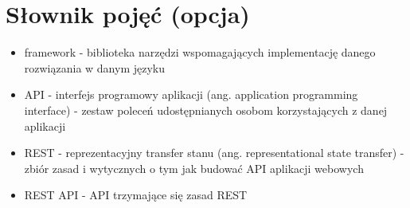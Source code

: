 \documentclass[../main.tex]{subfiles}
\begin{document}
\section{Słownik pojęć (opcja)}
    \begin{itemize}
        \item framework - biblioteka narzędzi wspomagających implementację danego rozwiązania w danym języku
        \item API - interfejs programowy aplikacji (ang. application programming interface) - zestaw poleceń udostępnianych osobom korzystających z danej aplikacji
        \item REST - reprezentacyjny transfer stanu (ang. representational state transfer) - zbiór zasad i wytycznych o tym jak budować API aplikacji webowych
        \item REST API - API trzymające się zasad REST
    \end{itemize}
\end{document}
